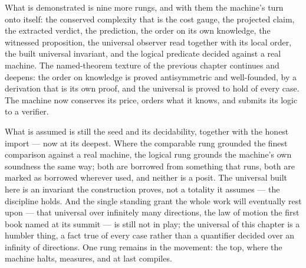 What is demonstrated is nine more rungs, and with them the machine's turn onto itself: the conserved
complexity that is the cost gauge, the projected claim, the extracted verdict, the prediction, the order on
its own knowledge, the witnessed proposition, the universal observer read together with its local order,
the built universal invariant, and the logical predicate decided against a real machine. The named-theorem texture of the
previous chapter continues and deepens: the order on knowledge is proved antisymmetric and well-founded,
by a derivation that is its own proof, and the universal is proved to hold of every case. The machine now
conserves its price, orders what it knows, and submits its logic to a verifier.

What is assumed is still the seed and its decidability, together with the honest import --- now at its
deepest. Where the comparable rung grounded the finest comparison against a real machine, the logical rung
grounds the machine's own soundness the same way; both are borrowed from something that runs, both are
marked as borrowed wherever used, and neither is a posit. The universal built here is an invariant the
construction proves, not a totality it assumes --- the discipline holds. And the single standing grant the
whole work will eventually rest upon --- that universal over infinitely many directions, the law of motion
the first book named at its summit --- is still not in play; the universal of this chapter is a humbler
thing, a fact true of every case rather than a quantifier decided over an infinity of directions. One rung
remains in the movement: the top, where the machine halts, measures, and at last compiles.
